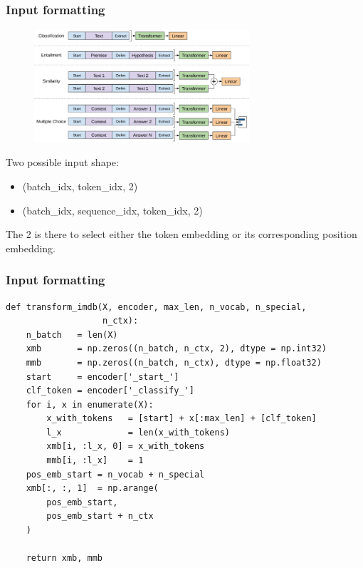 \documentclass[9pt]{beamer}
\begin{document}
\begin{frame}
  \frametitle{Input formatting}

  \begin{figure}
    \includegraphics[width = 8cm]{images/input_formatting.png}
  \end{figure}

  Two possible input shape:

  \begin{itemize}
  \item (batch\_idx, token\_idx, 2)
  \item (batch\_idx, sequence\_idx, token\_idx, 2)
  \end{itemize}

  \bigskip

  The 2 is there to select either the token embedding or its
  corresponding position embedding.
\end{frame}

\begin{frame}[fragile]
  \frametitle{Input formatting}

  \begin{lstlisting}
def transform_imdb(X, encoder, max_len, n_vocab, n_special,
                   n_ctx):
    n_batch   = len(X)
    xmb       = np.zeros((n_batch, n_ctx, 2), dtype = np.int32)
    mmb       = np.zeros((n_batch, n_ctx), dtype = np.float32)
    start     = encoder['_start_']
    clf_token = encoder['_classify_']
    for i, x in enumerate(X):
        x_with_tokens   = [start] + x[:max_len] + [clf_token]
        l_x             = len(x_with_tokens)
        xmb[i, :l_x, 0] = x_with_tokens
        mmb[i, :l_x]    = 1
    pos_emb_start = n_vocab + n_special
    xmb[:, :, 1]  = np.arange(
        pos_emb_start,
        pos_emb_start + n_ctx
    )

    return xmb, mmb
  \end{lstlisting}
\end{frame}
\end{document}
